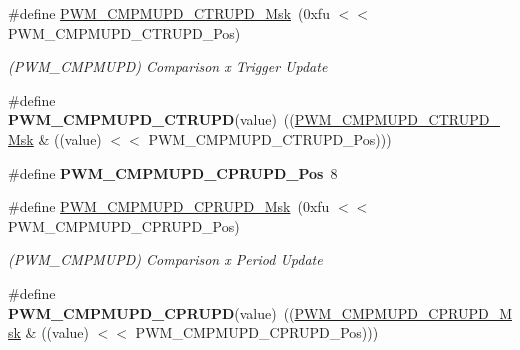 \begin{DoxyCompactItemize}
\item 
\mbox{\label{group__SAME70__PWM_gae4963293459d57314102b2a14c2d9c89}} 
\#define \mbox{\hyperlink{group__SAME70__PWM_gae4963293459d57314102b2a14c2d9c89}{P\+W\+M\+\_\+\+C\+M\+P\+M\+U\+P\+D\+\_\+\+C\+T\+R\+U\+P\+D\+\_\+\+Msk}}~(0xfu $<$$<$ P\+W\+M\+\_\+\+C\+M\+P\+M\+U\+P\+D\+\_\+\+C\+T\+R\+U\+P\+D\+\_\+\+Pos)
\begin{DoxyCompactList}\small\item\em (P\+W\+M\+\_\+\+C\+M\+P\+M\+U\+PD) Comparison x Trigger Update \end{DoxyCompactList}\item 
\mbox{\label{group__SAME70__PWM_gaa7fb8523c1acf3002ed4e7e9097af440}} 
\#define {\bfseries P\+W\+M\+\_\+\+C\+M\+P\+M\+U\+P\+D\+\_\+\+C\+T\+R\+U\+PD}(value)~((\mbox{\hyperlink{group__SAMV71__PWM_gae4963293459d57314102b2a14c2d9c89}{P\+W\+M\+\_\+\+C\+M\+P\+M\+U\+P\+D\+\_\+\+C\+T\+R\+U\+P\+D\+\_\+\+Msk}} \& ((value) $<$$<$ P\+W\+M\+\_\+\+C\+M\+P\+M\+U\+P\+D\+\_\+\+C\+T\+R\+U\+P\+D\+\_\+\+Pos)))
\item 
\mbox{\label{group__SAME70__PWM_ga172bcf93f25ed51f493dff85c9ab569a}} 
\#define {\bfseries P\+W\+M\+\_\+\+C\+M\+P\+M\+U\+P\+D\+\_\+\+C\+P\+R\+U\+P\+D\+\_\+\+Pos}~8
\item 
\mbox{\label{group__SAME70__PWM_ga9a42f6b4ac753fe27df637c3cfba9ec7}} 
\#define \mbox{\hyperlink{group__SAME70__PWM_ga9a42f6b4ac753fe27df637c3cfba9ec7}{P\+W\+M\+\_\+\+C\+M\+P\+M\+U\+P\+D\+\_\+\+C\+P\+R\+U\+P\+D\+\_\+\+Msk}}~(0xfu $<$$<$ P\+W\+M\+\_\+\+C\+M\+P\+M\+U\+P\+D\+\_\+\+C\+P\+R\+U\+P\+D\+\_\+\+Pos)
\begin{DoxyCompactList}\small\item\em (P\+W\+M\+\_\+\+C\+M\+P\+M\+U\+PD) Comparison x Period Update \end{DoxyCompactList}\item 
\mbox{\label{group__SAME70__PWM_ga55aea1151db2640b6a1fafb9a7cc023e}} 
\#define {\bfseries P\+W\+M\+\_\+\+C\+M\+P\+M\+U\+P\+D\+\_\+\+C\+P\+R\+U\+PD}(value)~((\mbox{\hyperlink{group__SAMV71__PWM_ga9a42f6b4ac753fe27df637c3cfba9ec7}{P\+W\+M\+\_\+\+C\+M\+P\+M\+U\+P\+D\+\_\+\+C\+P\+R\+U\+P\+D\+\_\+\+Msk}} \& ((value) $<$$<$ P\+W\+M\+\_\+\+C\+M\+P\+M\+U\+P\+D\+\_\+\+C\+P\+R\+U\+P\+D\+\_\+\+Pos)))

\end{DoxyCompactItemize}
